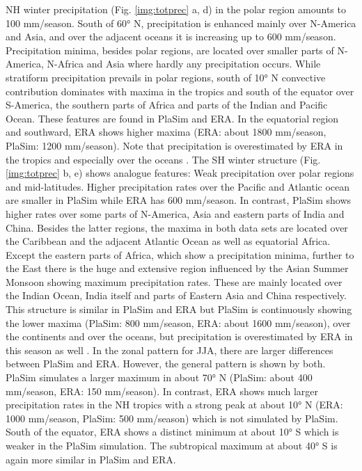 \documentclass[12pt,a4paper,twoside,openright,headinclude,liststotoc,bibtotoc]{scrreprt}
\begin{document}
NH winter precipitation (Fig. \ref{img:totprec} a, d) in the polar region amounts to 100 mm/season. South of 60° N, precipitation is enhanced mainly over N-America and Asia, and over the adjacent oceans it is increasing up to 600 mm/season. Precipitation minima, besides polar regions, are located over smaller parts of N-America, N-Africa and Asia where hardly any precipitation occurs. While stratiform precipitation prevails in polar regions, south of 10° N convective contribution dominates with maxima in the tropics and south of the equator over S-America, the southern parts of Africa and parts of the Indian and Pacific Ocean. These features are found in PlaSim and ERA. In the equatorial region and southward, ERA shows higher maxima (ERA: about 1800 mm/season, PlaSim: 1200 mm/season). Note that precipitation is overestimated by ERA in the tropics and especially over the oceans \citep{Hagemann2005}. The SH winter structure (Fig. \ref{img:totprec} b, e) shows analogue features: Weak precipitation over polar regions and mid-latitudes. Higher precipitation rates over the Pacific and Atlantic ocean are smaller in PlaSim while ERA has 600 mm/season. In contrast, PlaSim shows higher rates over some parts of N-America, Asia and eastern parts of India and China. Besides the latter regions, the maxima in both data sets are located over the Caribbean and the adjacent Atlantic Ocean as well as equatorial Africa. Except the eastern parts of Africa, which show a precipitation minima, further to the East there is the huge and extensive region influenced by the Asian Summer Monsoon showing maximum precipitation rates. These are mainly located over the Indian Ocean, India itself and parts of Eastern Asia and China respectively. This structure is similar in PlaSim and ERA but PlaSim is continuously showing the lower maxima (PlaSim: 800 mm/season, ERA: about 1600 mm/season), over the continents and over the oceans, but precipitation is overestimated by ERA in this season as well \citep{Hagemann2005}. In the zonal pattern for JJA, there are larger differences between PlaSim and ERA. However, the general pattern is shown by both. PlaSim simulates a larger maximum in about 70° N (PlaSim: about 400 mm/season, ERA: 150 mm/season). In contrast, ERA shows much larger precipitation rates in the NH tropics with a strong peak at about 10° N (ERA: 1000 mm/season, PlaSim: 500 mm/season) which is not simulated by PlaSim. South of the equator, ERA shows a distinct minimum at about 10° S which is weaker in the PlaSim simulation. The subtropical maximum at about 40° S is again more similar in PlaSim and ERA.
\end{document}
